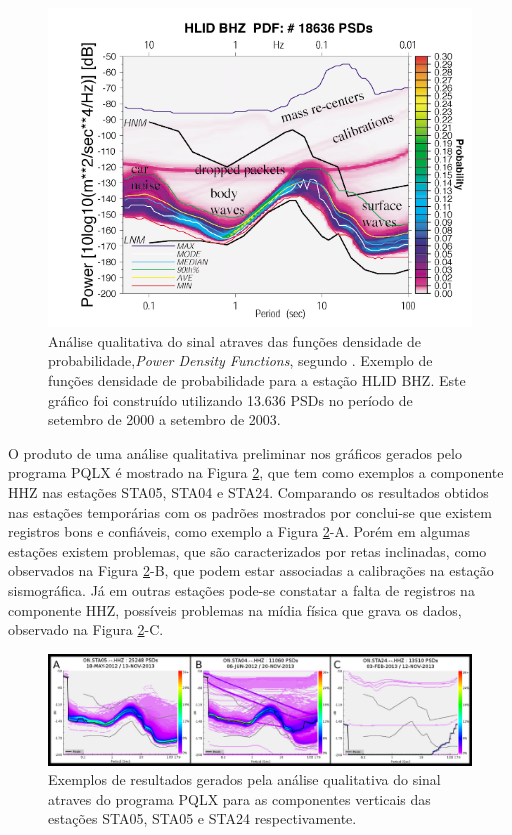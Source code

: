 \begin{figure}[!ht]
\centering
\includegraphics[scale=0.7]{Figs/mcnamura_buland.png}
\caption[Análise qualitativa do sinal através das funções densidade de probabilidade]{Análise qualitativa do sinal atraves das funções densidade de probabilidade,\textit{Power Density Functions}, segundo \cite{McNamara_Buland_2004}. Exemplo de funções densidade de probabilidade para a estação HLID BHZ. Este gráfico foi construído utilizando 13.636 PSDs no período de setembro de 2000 a setembro de 2003.}
\label{PQLX}
\end{figure}

O produto de uma análise qualitativa preliminar nos gráficos gerados pelo programa PQLX é mostrado na Figura \ref{PQLX_results}, que tem como exemplos a componente HHZ nas estações STA05, STA04 e STA24. Comparando os resultados obtidos nas estações temporárias com os padrões mostrados por \cite{McNamara_Buland_2004} conclui-se que existem registros bons e confiáveis, como exemplo a Figura \ref{PQLX_results}-A. Porém em algumas estações existem problemas, que são caracterizados por retas inclinadas, como observados na Figura \ref{PQLX_results}-B, que podem estar associadas a calibrações na estação sismográfica. Já em outras estações pode-se constatar a falta de registros na componente HHZ, possíveis problemas na mídia física que grava os dados, observado na Figura \ref{PQLX_results}-C.

\begin{figure}[!ht]
\centering
\includegraphics[scale=0.3]{Figs/pqlx_results.png}
\caption{Exemplos de resultados gerados pela análise qualitativa do sinal atraves do programa PQLX para as componentes verticais das estações STA05, STA05 e STA24 respectivamente.}
\label{PQLX_results}
\end{figure}

